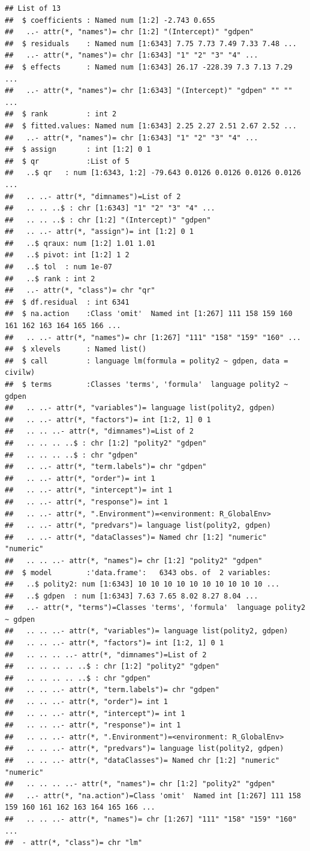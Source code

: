 \documentclass[]{article}
\begin{document}
\begin{verbatim}
## List of 13
##  $ coefficients : Named num [1:2] -2.743 0.655
##   ..- attr(*, "names")= chr [1:2] "(Intercept)" "gdpen"
##  $ residuals    : Named num [1:6343] 7.75 7.73 7.49 7.33 7.48 ...
##   ..- attr(*, "names")= chr [1:6343] "1" "2" "3" "4" ...
##  $ effects      : Named num [1:6343] 26.17 -228.39 7.3 7.13 7.29 ...
##   ..- attr(*, "names")= chr [1:6343] "(Intercept)" "gdpen" "" "" ...
##  $ rank         : int 2
##  $ fitted.values: Named num [1:6343] 2.25 2.27 2.51 2.67 2.52 ...
##   ..- attr(*, "names")= chr [1:6343] "1" "2" "3" "4" ...
##  $ assign       : int [1:2] 0 1
##  $ qr           :List of 5
##   ..$ qr   : num [1:6343, 1:2] -79.643 0.0126 0.0126 0.0126 0.0126 ...
##   .. ..- attr(*, "dimnames")=List of 2
##   .. .. ..$ : chr [1:6343] "1" "2" "3" "4" ...
##   .. .. ..$ : chr [1:2] "(Intercept)" "gdpen"
##   .. ..- attr(*, "assign")= int [1:2] 0 1
##   ..$ qraux: num [1:2] 1.01 1.01
##   ..$ pivot: int [1:2] 1 2
##   ..$ tol  : num 1e-07
##   ..$ rank : int 2
##   ..- attr(*, "class")= chr "qr"
##  $ df.residual  : int 6341
##  $ na.action    :Class 'omit'  Named int [1:267] 111 158 159 160 161 162 163 164 165 166 ...
##   .. ..- attr(*, "names")= chr [1:267] "111" "158" "159" "160" ...
##  $ xlevels      : Named list()
##  $ call         : language lm(formula = polity2 ~ gdpen, data = civilw)
##  $ terms        :Classes 'terms', 'formula'  language polity2 ~ gdpen
##   .. ..- attr(*, "variables")= language list(polity2, gdpen)
##   .. ..- attr(*, "factors")= int [1:2, 1] 0 1
##   .. .. ..- attr(*, "dimnames")=List of 2
##   .. .. .. ..$ : chr [1:2] "polity2" "gdpen"
##   .. .. .. ..$ : chr "gdpen"
##   .. ..- attr(*, "term.labels")= chr "gdpen"
##   .. ..- attr(*, "order")= int 1
##   .. ..- attr(*, "intercept")= int 1
##   .. ..- attr(*, "response")= int 1
##   .. ..- attr(*, ".Environment")=<environment: R_GlobalEnv> 
##   .. ..- attr(*, "predvars")= language list(polity2, gdpen)
##   .. ..- attr(*, "dataClasses")= Named chr [1:2] "numeric" "numeric"
##   .. .. ..- attr(*, "names")= chr [1:2] "polity2" "gdpen"
##  $ model        :'data.frame':   6343 obs. of  2 variables:
##   ..$ polity2: num [1:6343] 10 10 10 10 10 10 10 10 10 10 ...
##   ..$ gdpen  : num [1:6343] 7.63 7.65 8.02 8.27 8.04 ...
##   ..- attr(*, "terms")=Classes 'terms', 'formula'  language polity2 ~ gdpen
##   .. .. ..- attr(*, "variables")= language list(polity2, gdpen)
##   .. .. ..- attr(*, "factors")= int [1:2, 1] 0 1
##   .. .. .. ..- attr(*, "dimnames")=List of 2
##   .. .. .. .. ..$ : chr [1:2] "polity2" "gdpen"
##   .. .. .. .. ..$ : chr "gdpen"
##   .. .. ..- attr(*, "term.labels")= chr "gdpen"
##   .. .. ..- attr(*, "order")= int 1
##   .. .. ..- attr(*, "intercept")= int 1
##   .. .. ..- attr(*, "response")= int 1
##   .. .. ..- attr(*, ".Environment")=<environment: R_GlobalEnv> 
##   .. .. ..- attr(*, "predvars")= language list(polity2, gdpen)
##   .. .. ..- attr(*, "dataClasses")= Named chr [1:2] "numeric" "numeric"
##   .. .. .. ..- attr(*, "names")= chr [1:2] "polity2" "gdpen"
##   ..- attr(*, "na.action")=Class 'omit'  Named int [1:267] 111 158 159 160 161 162 163 164 165 166 ...
##   .. .. ..- attr(*, "names")= chr [1:267] "111" "158" "159" "160" ...
##  - attr(*, "class")= chr "lm"
\end{verbatim}
\end{document}
